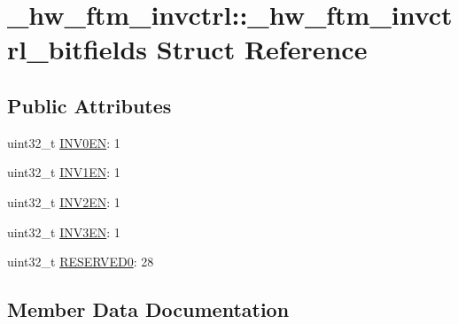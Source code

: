\hypertarget{struct__hw__ftm__invctrl_1_1__hw__ftm__invctrl__bitfields}{}\section{\+\_\+hw\+\_\+ftm\+\_\+invctrl\+:\+:\+\_\+hw\+\_\+ftm\+\_\+invctrl\+\_\+bitfields Struct Reference}
\label{struct__hw__ftm__invctrl_1_1__hw__ftm__invctrl__bitfields}
\subsection*{Public Attributes}
\begin{DoxyCompactItemize}
\item 
uint32\+\_\+t \hyperlink{struct__hw__ftm__invctrl_1_1__hw__ftm__invctrl__bitfields_a4b12d23f3731fd97879dd4639e143bb6}{I\+N\+V0\+EN}\+: 1
\item 
uint32\+\_\+t \hyperlink{struct__hw__ftm__invctrl_1_1__hw__ftm__invctrl__bitfields_a83d2d957212b7c5222329a68da85d952}{I\+N\+V1\+EN}\+: 1
\item 
uint32\+\_\+t \hyperlink{struct__hw__ftm__invctrl_1_1__hw__ftm__invctrl__bitfields_ac65f966a941b815d2d8f2a9894dc7641}{I\+N\+V2\+EN}\+: 1
\item 
uint32\+\_\+t \hyperlink{struct__hw__ftm__invctrl_1_1__hw__ftm__invctrl__bitfields_a0dad01f54bda320b2d16ee0c5a04b2b3}{I\+N\+V3\+EN}\+: 1
\item 
uint32\+\_\+t \hyperlink{struct__hw__ftm__invctrl_1_1__hw__ftm__invctrl__bitfields_abcdc3f4e5ac04d225df498c564f21d34}{R\+E\+S\+E\+R\+V\+E\+D0}\+: 28
\end{DoxyCompactItemize}


\subsection{Member Data Documentation}

